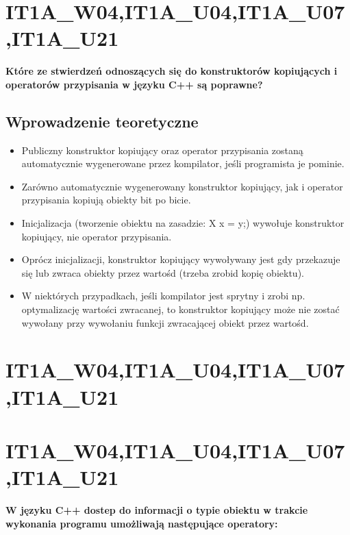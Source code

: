 
\section{IT1A\_W04,IT1A\_U04,IT1A\_U07,IT1A\_U21}
\textbf{Które ze stwierdzeń odnoszących się do konstruktorów kopiujących i operatorów przypisania w języku C++ są poprawne?}

\subsection{Wprowadzenie teoretyczne}
\begin{itemize}
\item Publiczny konstruktor kopiujący oraz operator przypisania zostaną automatycznie wygenerowane przez kompilator, jeśli programista je pominie.
\item Zarówno automatycznie wygenerowany konstruktor kopiujący, jak i operator przypisania kopiują obiekty bit po bicie.
\item Inicjalizacja (tworzenie obiektu na zasadzie: X x = y;) wywołuje konstruktor kopiujący, nie operator przypisania.
\item Oprócz inicjalizacji, konstruktor kopiujący wywoływany jest gdy przekazuje się lub zwraca obiekty przez wartośd (trzeba zrobid kopię obiektu).
\item W niektórych przypadkach, jeśli kompilator jest sprytny i zrobi np. optymalizację wartości zwracanej, to konstruktor kopiujący może nie zostać wywołany przy wywołaniu funkcji zwracającej obiekt przez wartośd.
\end{itemize}


\section{IT1A\_W04,IT1A\_U04,IT1A\_U07,IT1A\_U21}


\section{IT1A\_W04,IT1A\_U04,IT1A\_U07,IT1A\_U21}
\textbf{W języku C++ dostep do informacji o typie obiektu w trakcie wykonania programu umożliwają następujące operatory:}

